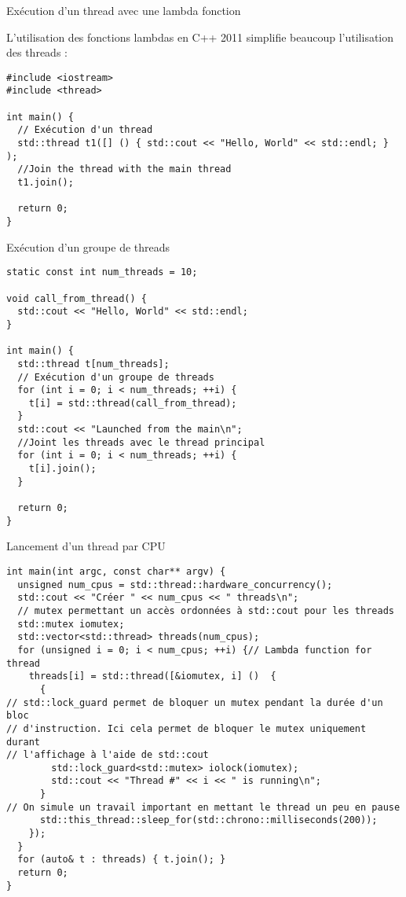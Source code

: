 \documentclass[handout,francais]{beamer}
\begin{document}
\begin{frame}[fragile]{Exécution d'un thread avec une lambda fonction}

L'utilisation des fonctions lambdas en C++ 2011 simplifie beaucoup
l'utilisation des threads :

\begin{lstlisting}
#include <iostream>
#include <thread>

int main() {
  // Exécution d'un thread
  std::thread t1([] () { std::cout << "Hello, World" << std::endl; } );
  //Join the thread with the main thread
  t1.join();

  return 0;
}
\end{lstlisting}

\end{frame}

\begin{frame}[fragile]{Exécution d'un groupe de threads}
 
 \begin{lstlisting}
static const int num_threads = 10;

void call_from_thread() {
  std::cout << "Hello, World" << std::endl;
}

int main() {
  std::thread t[num_threads];
  // Exécution d'un groupe de threads
  for (int i = 0; i < num_threads; ++i) {
    t[i] = std::thread(call_from_thread);
  }
  std::cout << "Launched from the main\n";
  //Joint les threads avec le thread principal
  for (int i = 0; i < num_threads; ++i) {
    t[i].join();
  }

  return 0;
}
\end{lstlisting}
\end{frame}

\begin{frame}[fragile]{Lancement d'un thread par CPU}
\begin{lstlisting}
int main(int argc, const char** argv) {
  unsigned num_cpus = std::thread::hardware_concurrency();
  std::cout << "Créer " << num_cpus << " threads\n";
  // mutex permettant un accès ordonnées à std::cout pour les threads
  std::mutex iomutex;
  std::vector<std::thread> threads(num_cpus);
  for (unsigned i = 0; i < num_cpus; ++i) {// Lambda function for thread
    threads[i] = std::thread([&iomutex, i] ()  {
      {
// std::lock_guard permet de bloquer un mutex pendant la durée d'un bloc
// d'instruction. Ici cela permet de bloquer le mutex uniquement durant
// l'affichage à l'aide de std::cout
        std::lock_guard<std::mutex> iolock(iomutex);
        std::cout << "Thread #" << i << " is running\n";
      }
// On simule un travail important en mettant le thread un peu en pause
      std::this_thread::sleep_for(std::chrono::milliseconds(200));
    });
  }
  for (auto& t : threads) { t.join(); }
  return 0;
} 
\end{lstlisting}
\end{frame}
\end{document}
